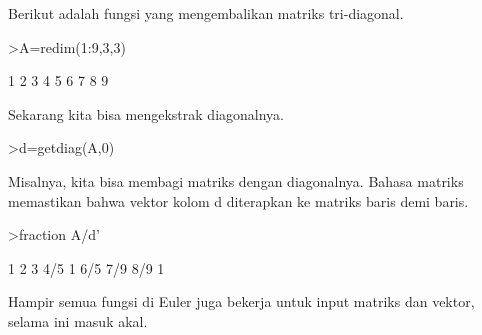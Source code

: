 \documentclass[a4paper,10pt]{article}
\begin{document}
\begin{eulernotebook}
\begin{eulercomment}
\begin{eulercomment}
\begin{eulercomment}
\begin{eulercomment}
\begin{eulercomment}
\begin{eulercomment}
\begin{eulercomment}
\begin{eulercomment}
\begin{eulercomment}
\begin{eulercomment}
\begin{eulercomment}
\begin{eulercomment}
\begin{eulercomment}
\begin{eulercomment}
\begin{eulercomment}
\begin{eulercomment}
\begin{eulercomment}
\begin{eulercomment}
\begin{eulercomment}
Berikut adalah fungsi yang mengembalikan matriks tri-diagonal.
\end{eulercomment}
\begin{eulerprompt}
>A=redim(1:9,3,3)
\end{eulerprompt}
\begin{euleroutput}
              1             2             3 
              4             5             6 
              7             8             9 
\end{euleroutput}
\begin{eulercomment}
Sekarang kita bisa mengekstrak diagonalnya.
\end{eulercomment}
\begin{eulerprompt}
>d=getdiag(A,0)
\end{eulerprompt}
\begin{euleroutput}
  [1,  5,  9]
\end{euleroutput}
\begin{eulercomment}
Misalnya, kita bisa membagi matriks dengan diagonalnya. Bahasa matriks
memastikan bahwa vektor kolom d diterapkan ke matriks baris demi
baris.
\end{eulercomment}
\begin{eulerprompt}
>fraction A/d'
\end{eulerprompt}
\begin{euleroutput}
          1         2         3 
        4/5         1       6/5 
        7/9       8/9         1 
\end{euleroutput}
\begin{eulercomment}
\begin{eulercomment}
\begin{eulercomment}
Hampir semua fungsi di Euler juga bekerja untuk input matriks dan
vektor, selama ini masuk akal.


\end{eulercomment}
\end{eulercomment}
\end{eulercomment}
\end{eulercomment}
\end{eulercomment}
\end{eulercomment}
\end{eulercomment}
\end{eulercomment}
\end{eulercomment}
\end{eulercomment}
\end{eulercomment}
\end{eulercomment}
\end{eulercomment}
\end{eulercomment}
\end{eulercomment}
\end{eulercomment}
\end{eulercomment}
\end{eulercomment}
\end{eulercomment}
\end{eulercomment}
\end{eulercomment}
\end{eulernotebook}
\end{document}
